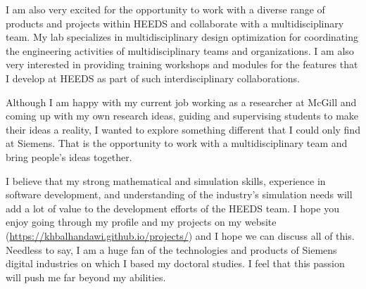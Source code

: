 \documentclass[12pt]{article} %
\begin{document}
I am also very excited for the opportunity to work with a diverse range of products and projects within HEEDS and collaborate with a multidisciplinary team. My lab specializes in multidisciplinary design optimization for coordinating the engineering activities of multidisciplinary teams and organizations. I am also very interested in providing training workshops and modules for the features that I develop at HEEDS as part of such interdisciplinary collaborations.

\medskip %

Although I am happy with my current job working as a researcher at McGill and coming up with my own research ideas, guiding and supervising students to make their ideas a reality, I wanted to explore something different that I could only find at Siemens. That is the opportunity to work with a multidisciplinary team and bring people's ideas together.

\medskip %

I believe that my strong mathematical and simulation skills, experience in software development, and understanding of the industry's simulation needs will add a lot of value to the development efforts of the HEEDS team. I hope you enjoy going through my profile and my projects on my website (\href{https://khbalhandawi.github.io/projects/}{https://khbalhandawi.github.io/projects/}) and I hope we can discuss all of this. Needless to say, I am a huge fan of the technologies and products of Siemens digital industries on which I based my doctoral studies. I feel that this passion will push me far beyond my abilities.



\end{document}
